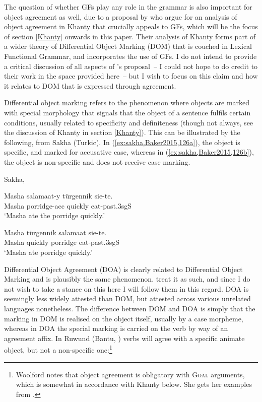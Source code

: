 \documentclass[output=paper
,modfonts
,nonflat]{langsci/langscibook}
\begin{document}
The question of whether GFs play any role in the grammar is also important for object agreement as well, due to a proposal by \citet{dn2011} who argue for an analysis of object agreement in Khanty that crucially appeals to GFs, which will be the focus of section \ref{Khanty} onwards in this paper.
Their analysis of Khanty forms part of a wider theory of Differential Object Marking (DOM) that is couched in Lexical Functional Grammar, and incorporates the use of GFs. I do not intend to provide a critical discussion of all aspects of \citeauthor{dn2011}'s proposal~-- I could not hope to do credit to their work in the space provided here~-- but I wish to focus on this claim and how it relates to DOM that is expressed through agreement.



Differential object marking refers to the phenomenon where objects are marked with special morphology that signals that the object of a sentence fulfils certain conditions, usually related to specificity and definiteness (though not always, see the discussion of Khanty in section \ref{Khanty}).
This can be illustrated by the following, from Sakha (Turkic).
In (\ref{ex:sakha,Baker2015,126a}), the object is specific, and marked for accusative case, whereas in (\ref{ex:sakha,Baker2015,126b}), the object is non-specific and does not receive case marking.

\begin{exe}
  \ex Sakha, \citet[][126]{Baker2015} \label{ex:sakha,Baker2015,126}
\begin{xlist}
\ex
\gll Masha salamaat-y türgennik sie-te.\\
Masha porridge-{\sc acc} quickly eat-{\sc past.3sgS}\\
\glt `Masha ate the porridge quickly.'  \label{ex:sakha,Baker2015,126a}

\ex
\gll Masha türgennik salamaat sie-te.\\
Masha quickly porridge eat-{\sc past.3sgS}\\
\glt `Masha ate porridge quickly.' \label{ex:sakha,Baker2015,126b}
\end{xlist}
\end{exe}


\noindent Differential Object Agreement (DOA) is clearly related to Differential Object Marking and is plausibly the same phenomenon.
\citeauthor{dn2011} treat it as such, and since I do not wish to take a stance on this here I will follow them in this regard. 
DOA is seemingly less widely attested than DOM, but attested across various unrelated languages nonetheless. 
The difference between DOM and DOA is simply that the marking in DOM is realised on the object itself, usually by a case morpheme, whereas in DOA the special marking is carried on the verb by way of an agreement affix. 
In Ruwund (Bantu, \citealt{woolford2001}) verbs will agree with a specific animate object, but not a non-specific one:\footnote{Woolford notes that object agreement is obligatory with \textsc{Goal} arguments, which is somewhat in accordance with Khanty below.
She gets her examples from \citet[][565]{nash1992}.}
\end{document}
